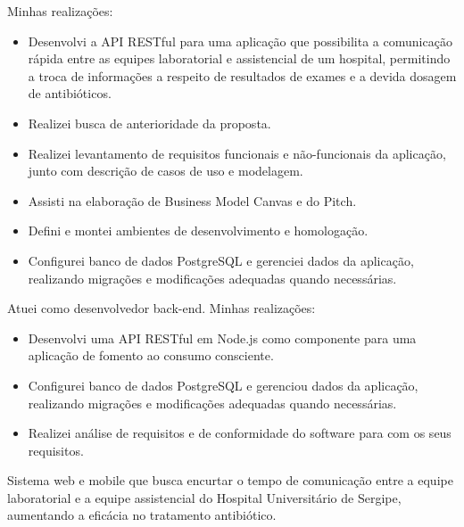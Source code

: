 \documentclass[10pt,a4paper,ragged2e,withhyper]{altacv}
\begin{document}
\begin{paracol}{2}
Minhas realizações:
\begin{itemize}
\item Desenvolvi a API RESTful para uma aplicação que possibilita a comunicação rápida entre as equipes laboratorial e assistencial de um hospital, permitindo a troca de informações a respeito de resultados de exames e a devida dosagem de antibióticos.
\item Realizei busca de anterioridade da proposta.
\item Realizei levantamento de requisitos funcionais e não-funcionais da aplicação, junto com descrição de casos de uso e modelagem.
\item Assisti na elaboração de Business Model Canvas e do Pitch.
\item Defini e montei ambientes de desenvolvimento e homologação.
\item Configurei banco de dados PostgreSQL e gerenciei dados da aplicação, realizando migrações e modificações adequadas quando necessárias.
\end{itemize}


\newpage

\par\divider
{}

Atuei como desenvolvedor back-end. Minhas realizações:
\begin{itemize}
\item Desenvolvi uma API RESTful em Node.js como componente para uma aplicação de fomento ao consumo consciente.
\item Configurei banco de dados PostgreSQL e gerenciou dados da aplicação, realizando migrações e modificações adequadas quando necessárias.
\item Realizei análise de requisitos e de conformidade do software para com os seus requisitos.
\end{itemize}

\newpage
\switchcolumn
{}
\label{sec:org9cbe5c3}

Sistema web e mobile que busca encurtar o tempo de comunicação entre a equipe laboratorial e a equipe assistencial do Hospital Universitário de Sergipe, aumentando a eficácia no tratamento antibiótico.


\end{paracol}
\end{document}
